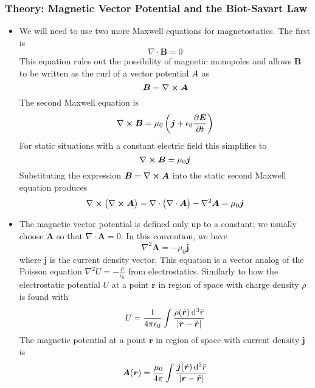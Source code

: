 \documentclass[11pt, a4paper]{article}
\newcommand{\diff}{\mathop{}\!\mathrm{d}} %
\renewcommand{\vec}[1]{\bm{#1}} %
\newcommand{\tvec}[1]{\tilde{\vec{#1}}} %
\renewcommand{\r}{\vec{r}}
\newcommand{\E}{\vec{E}}  %
\newcommand{\B}{\vec{B}}  %
\newcommand{\A}{\vec{A}}  %
\newcommand{\ee}{\epsilon_{0}}  %
\renewcommand{\div}{\nabla \cdot}
\renewcommand{\curl}{\nabla \cross}
\renewcommand{\laplacian}{\nabla^{2}}
\begin{document}
\subsubsection{Theory: Magnetic Vector Potential and the Biot-Savart Law}
\begin{itemize}
	\item We will need to use two more Maxwell equations for magnetostatics. The first is
	\begin{equation*}
		\div \B = 0
	\end{equation*}
	This equation rules out the possibility of magnetic monopoles and allows $ \B $ to be written as the curl of a vector potential $ \\A $ as
	\begin{equation*}
		\B = \curl \A
	\end{equation*}
	The second Maxwell equation is 
	\begin{equation*}
		\curl \B = \mu_{0}\left(\vec{j} + \ee \pdv{\E}{t}\right)
	\end{equation*}
	For static situations with a constant electric field this simplifies to
	\begin{equation*}
		\curl \B = \mu_{0}\vec{j}
	\end{equation*}
	Substituting the expression $ \B = \curl \A $ into the static second Maxwell equation produces
	\begin{equation*}
		\curl \big(\curl \A\big) = \div \big(\div \A\big) - \laplacian \A = \mu_{0} \vec{j}
	\end{equation*}
	
	\item The magnetic vector potential is defined only up to a constant; we usually choose $ \A $ so that $ \div \A = 0 $. In this convention, we have
	\begin{equation*}
		\laplacian \A = - \mu_{0}\vec{j}
	\end{equation*}
	where $ \vec{j} $ is the current density vector. This equation is a vector analog of the Poisson equation $ \laplacian U = - \frac{\rho}{\ee} $ from electrostatics. Similarly to how the electrostatic potential $ U $ at a point $ \r $ in region of space with charge density $ \rho $ is found with
	\begin{equation*}
		U = \frac{1}{4 \pi \ee} \int \frac{\rho(\tvec{r})\diff^{3}\tilde{r}}{\abs{\r - \tvec{r}}}
	\end{equation*}
	The magnetic potential at a point $ \r $ in region of space with current density $ \vec{j} $ is
	\begin{equation*}
		\A(\r) = \frac{\mu_{0}}{4 \pi} \int \frac{\vec{j}(\tvec{r})\diff^{3}\tilde{r}}{\abs{\r - \tvec{r}}}
	\end{equation*}
	

\end{itemize}
\end{document}
